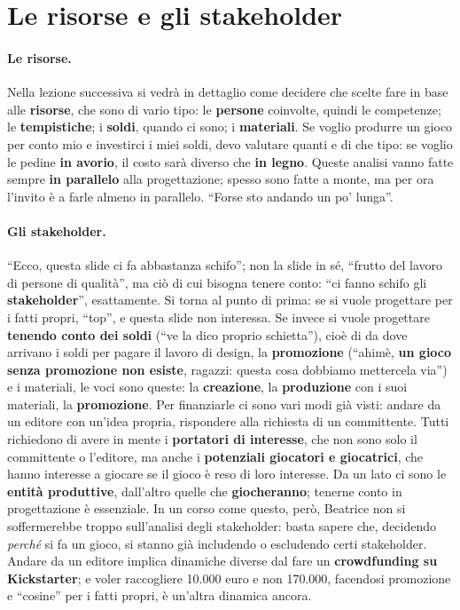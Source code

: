\section{Le risorse e gli stakeholder}
\label{a6:sec:stakeholder}



\paragraph{Le risorse.} Nella lezione successiva si vedrà in dettaglio come decidere
che scelte fare in base alle \textbf{risorse}, che sono di vario tipo: le
\textbf{persone} coinvolte, quindi le competenze; le \textbf{tempistiche}; i
\textbf{soldi}, quando ci sono; i \textbf{materiali}. Se voglio produrre un gioco per
conto mio e investirci i miei soldi, devo valutare quanti e di che tipo: se voglio le
pedine \textbf{in avorio}, il costo sarà diverso che \textbf{in legno}. Queste analisi
vanno fatte sempre \textbf{in parallelo} alla progettazione; spesso sono fatte a monte,
ma per ora l'invito è a farle almeno in parallelo. ``Forse sto andando un po' lunga''.

\paragraph{Gli stakeholder.} ``Ecco, questa slide ci fa abbastanza schifo''; non la
slide in sé, ``frutto del lavoro di persone di qualità'', ma ciò di cui bisogna tenere
conto: ``ci fanno schifo gli \textbf{stakeholder}'', esattamente. Si torna al punto di
prima: se si vuole progettare per i fatti propri, ``top'', e questa slide non
interessa. Se invece si vuole progettare \textbf{tenendo conto dei soldi} (``ve la dico
proprio schietta''), cioè di da dove arrivano i soldi per pagare il lavoro di design,
la \textbf{promozione} (``ahimè, \textbf{un gioco senza promozione non esiste},
ragazzi: questa cosa dobbiamo mettercela via'') e i materiali, le voci sono queste: la
\textbf{creazione}, la \textbf{produzione} con i suoi materiali, la
\textbf{promozione}. Per finanziarle ci sono vari modi già visti: andare da un editore
con un'idea propria, rispondere alla richiesta di un committente. Tutti richiedono di
avere in mente i \textbf{portatori di interesse}, che non sono solo il committente o
l'editore, ma anche i \textbf{potenziali giocatori e giocatrici}, che hanno interesse
a giocare se il gioco è reso di loro interesse. Da un lato ci sono le \textbf{entità
produttive}, dall'altro quelle che \textbf{giocheranno}; tenerne conto in
progettazione è essenziale. In un corso come questo, però, Beatrice non si
soffermerebbe troppo sull'analisi degli stakeholder: basta sapere che, decidendo
\emph{perché} si fa un gioco, si stanno già includendo o escludendo certi stakeholder.
Andare da un editore implica dinamiche diverse dal fare un \textbf{crowdfunding su
Kickstarter}; e voler raccogliere 10.000 euro e non 170.000, facendosi promozione e
``cosine'' per i fatti propri, è un'altra dinamica ancora.


